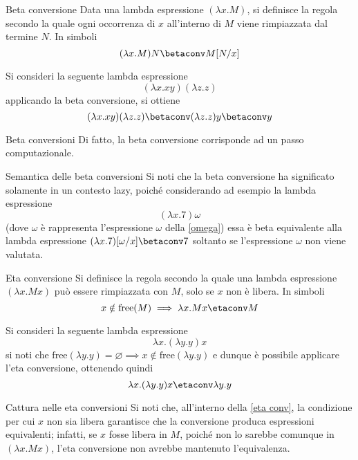 \documentclass[a4paper, 12pt]{report}
\begin{document}
    \begin{frameddefn}[label={beta conv}]{Beta conversione}
        Data una lambda espressione $(\lambda x.M)$, si definisce  la regola secondo la quale ogni occorrenza di $x$ all'interno di $M$ viene rimpiazzata dal termine $N$. In simboli $$(\lambda x.M)N \betaconv M[N/x]$$
    \end{frameddefn}

    \begin{example}
        Si consideri la seguente lambda espressione $$(\lambda x.xy)(\lambda z.z)$$ applicando la beta conversione, si ottiene $$(\lambda x.xy)(\lambda z.z) \betaconv (\lambda z.z)y \betaconv y$$
    \end{example}

    \begin{framedobs}{Beta conversioni}
        Di fatto, la beta conversione corrisponde ad un passo computazionale.
    \end{framedobs}

    \begin{framedobs}{Semantica delle beta conversioni}
        Si noti che la beta conversione ha significato solamente in un contesto lazy, poiché considerando ad esempio la lambda espressione $$(\lambda x.7) \omega$$ (dove $\omega$ è rappresenta l'espressione $\omega$ della \cref{omega}) essa è beta equivalente alla lambda espressione $(\lambda x.7)[\omega/x] \betaconv 7$ soltanto se l'espressione $\omega$ non viene valutata.
    \end{framedobs}

    \begin{frameddefn}[label={eta conv}]{Eta conversione}
        Si definisce  la regola secondo la quale una lambda espressione $(\lambda x.Mx)$ può essere rimpiazzata con $M$, solo se $x$ non è libera. In simboli $$x \notin \mathrm{free}(M) \implies \lambda x.Mx \etaconv M$$
    \end{frameddefn}

    \begin{example}
        Si consideri la seguente lambda espressione $$\lambda x.(\lambda y.y)x$$ si noti che $\mathrm{free}(\lambda y.y) = \varnothing \implies x \notin \mathrm{free}(\lambda y.y)$ e dunque è possibile applicare l'eta conversione, ottenendo quindi $$\lambda x .(\lambda y.y) x \etaconv \lambda y.y$$
    \end{example}

    \begin{framedobs}{Cattura nelle eta conversioni}
        Si noti che, all'interno della \cref{eta conv}, la condizione per cui $x$ non sia libera garantisce che la conversione produca espressioni equivalenti; infatti, se $x$ fosse libera in $M$, poiché non lo sarebbe comunque in $(\lambda x.Mx)$, l'eta conversione non avrebbe mantenuto l'equivalenza.
    \end{framedobs}
\end{document}
